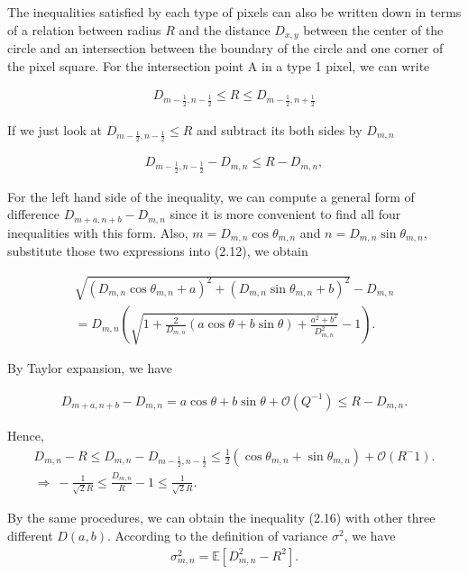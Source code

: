 \documentclass[letterpaper]{article}
\numberwithin{equation}{section} %
\numberwithin{figure}{section} %
\numberwithin{table}{section} %
\begin{document}
\noindent
The inequalities satisfied by each type of pixels can also be written down in terms of a relation between radius $R$ and the distance $D_{x,y}$ between the center of the circle and an intersection between the boundary of the circle and one corner of the pixel square. For the intersection point A in a type 1 pixel, we can write 

\begin{align} 
D_{m-\frac{1}{2},n-\frac{1}{2}} \leq R \leq D_{m-\frac{1}{2},n+\frac{1}{2}}
\end{align}

\noindent
If we just look at $D_{m-\frac{1}{2},n-\frac{1}{2}} \leq R$ and subtract its both sides by $D_{m,n}$

\begin{align} 
D_{m-\frac{1}{2},n-\frac{1}{2}} - D_{m,n} \leq R- D_{m,n},
\end{align}

\noindent
For the left hand side of the inequality, we can compute a general form of difference $D_{m+a,n+b} - D_{m,n}$ since it is more convenient to find all four inequalities with this form. Also, $m=D_{m,n}\cos \theta_{m,n}$ and $n=D_{m,n}\sin \theta_{m,n}$, substitute those two expressions into (2.12), we obtain

\begin{align}
\sqrt{(D_{m,n}\cos \theta_{m,n}+a)^2+(D_{m,n}\sin \theta_{m,n} +b)^2}-D_{m,n} \\
= D_{m,n}(\sqrt{1+\frac{2}{D_{m,n}}(a\cos \theta+b\sin \theta)+\frac{a^2+b^2}{D_{m,n}^2}}-1).
\end{align}

\noindent
By Taylor expansion, we have 

\begin{align} 
D_{m+a, n+b}-D_{m,n} = a\cos \theta +b\sin \theta + \mathcal{O}(Q^{-1}) \leq R-D_{m,n}.
\end{align}

\noindent
Hence, 
\begin{align} 
D_{m,n}-R \leq D_{m,n}-D_{m-\frac{1}{2},n-\frac{1}{2}} \leq \frac{1}{2}(\cos \theta_{m,n}+\sin \theta_{m,n})+\mathcal{O}(R^-1). \\
\Rightarrow \ -\frac{1}{\sqrt{2}R} \leq \frac{D_{m,n}}{R}-1 \leq \frac{1}{\sqrt{2}R}.
\end{align}

\noindent 
By the same procedures, we can obtain the inequality (2.16) with other three different $D(a,b)$. According to the definition of variance $\sigma^2$, we have 
\begin{align} 
\sigma_{m,n}^2 = \mathbb{E}[D_{m,n}^2-R^2].
\end{align}
\end{document}
